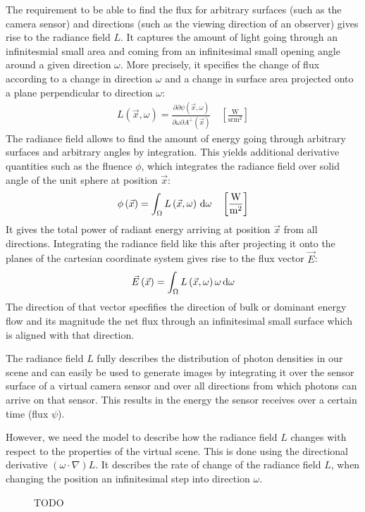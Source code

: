 The requirement to be able to find the flux for arbitrary surfaces (such as the camera sensor) and directions (such as the viewing direction of an observer) gives rise to the radiance field $L$. It captures the amount of light going through an infinitesmial small area and coming from an infinitesimal small opening angle around a given direction $\omega$. More precisely, it specifies the change of flux according to a change in direction $\omega$ and a change in surface area projected onto a plane perpendicular to direction $\omega$:
\begin{align*}
L\left(\vec{x}, \omega\right) = \frac{\partial\partial\psi\left(\vec{x}, \omega\right)}{\partial\omega\partial A^\perp\left(\vec{x}\right)}
\quad
\left[\frac{\si{\watt}}{\si{\steradian} \si{\meter}^2}\right]
\end{align*}
The radiance field allows to find the amount of energy going through arbitrary surfaces and arbitrary angles by integration. This yields additional derivative quantities such as the fluence $\phi$, which integrates the radiance field over solid angle of the unit sphere at position $\vec{x}$:
\begin{align*}
\phi\left(\vec{x}\right) = \int_\Omega L\left(\vec{x}, \omega\right) \,\mathrm{d}\omega
\quad
\left[\frac{\si{\watt}}{\si{\meter}^2}\right]
\end{align*}
It gives the total power of radiant energy arriving at position $\vec{x}$ from all directions. Integrating the radiance field like this after projecting it onto the planes of the cartesian coordinate system gives rise to the flux vector $\vec{E}$:
\begin{align*}
\vec{E}\left(\vec{x}\right) = \int_\Omega L\left(\vec{x}, \omega\right)\omega \,\mathrm{d}\omega
\end{align*}
The direction of that vector specfifies the direction of bulk or dominant energy flow and its magnitude the net flux through an infinitesimal small surface which is aligned with that direction.

The radiance field $L$ fully describes the distribution of photon densities in our scene and can easily be used to generate images by integrating it over the sensor surface of a virtual camera sensor and over all directions from which photons can arrive on that sensor. This results in the energy the sensor receives over a certain time (flux $\psi$).

However, we need the model to describe how the radiance field $L$ changes with respect to the properties of the virtual scene. This is done using the directional derivative $\left(\omega\cdot\nabla\right)L$. It describes the rate of change of the radiance field $L$, when changing the position an infinitesimal step into direction $\omega$.
\begin{figure}[h]
\centering
{}
\caption{TODO}
\label{fig:rte_change_of_L}
\end{figure}

